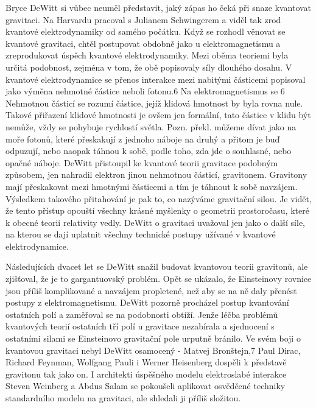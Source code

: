   Bryce DeWitt si vůbec neuměl představit, jaký zápas ho čeká při snaze kvantovat gravitaci. Na
  Harvardu pracoval s Julianem Schwingerem a viděl tak zrod kvantové elektrodynamiky od samého
  počátku. Když se rozhodl věnovat se kvantové gravitaci, chtěl postupovat obdobně jako u
  elektromagnetismu a zreprodukovat úspěch kvantové elektrodynamiky. Mezi oběma teoriemi byla určitá
  podobnost, zejména v tom, že obě popisovaly síly dlouhého dosahu. V kvantové elektrodynamice se
  přenos interakce mezi nabitými částicemi popisoval jako výměna nehmotné částice neboli fotonu.6 Na
  elektromagnetismus se 6 Nehmotnou částicí se rozumí částice, jejíž klidová hmotnost by byla rovna
  nule. Takové přiřazení klidové hmotnosti je ovšem jen formální, tato částice v klidu být nemůže,
  vždy se pohybuje rychlostí světla. Pozn. překl. můžeme dívat jako na moře fotonů, které přeskakují
  z jednoho náboje na druhý a přitom je buď odpuzují, nebo naopak táhnou k sobě, podle toho, zda jde
  o souhlasné, nebo opačné náboje. DeWitt přistoupil ke kvantové teorii gravitace podobným způsobem,
  jen nahradil elektron jinou nehmotnou částicí, gravitonem. Gravitony mají přeskakovat mezi
  hmotnými částicemi a tím je táhnout k sobě navzájem. Výsledkem takového přitahování je pak to, co
  nazýváme gravitační silou. Je vidět, že tento přístup opouští všechny krásné myšlenky o geometrii
  prostoročasu, které k obecné teorii relativity vedly. DeWitt o gravitaci uvažoval jen jako o další
  síle, na kterou se dají uplatnit všechny technické postupy užívané v kvantové elektrodynamice.
  
  Následujících dvacet let se DeWitt snažil budovat kvantovou teorii gravitonů, ale zjišťoval, že je
  to gargantuovský problém. Opět se ukázalo, že Einsteinovy rovnice jsou příliš komplikované a
  navzájem propletené, než aby se na ně daly přenést postupy z elektromagnetismu. DeWitt pozorně
  procházel postup kvantování ostatních polí a zaměřoval se na podobnosti obtíží. Jenže léčba
  problémů kvantových teorií ostatních tří polí u gravitace nezabírala a sjednocení s ostatními
  silami se Einsteinovo gravitační pole urputně bránilo. Ve svém boji o kvantovou gravitaci nebyl
  DeWitt osamocený - Matvej Bronštejn,7 Paul Dirac, Richard Feynman, Wolfgang Pauli i Werner
  Heisenberg dospěli k představě gravitonu tak jako on. I architekti úspěšného modelu elektroslabé
  interakce Steven Weinberg a Abdus Salam se pokoušeli aplikovat osvědčené techniky standardního
  modelu na gravitaci, ale shledali ji příliš složitou. 
  
